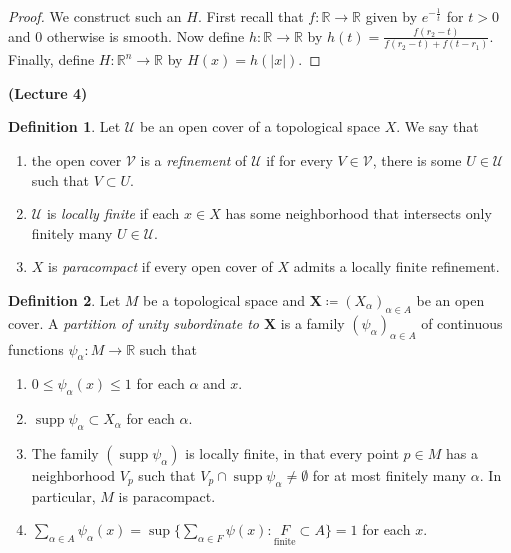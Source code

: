 \documentclass[10pt,letterpaper,cm]{nupset}
\theoremstyle{definition}
\newtheorem*{definition}{Definition}
\newcommand{\R}{\mathbb R}
\newcommand{\X}{\mathbf X}
\newcommand{\1}{\mathbf{1}}
\newcommand{\0}{\vec 0}
\DeclareMathOperator{\supp}{supp}
\begin{document}
\begin{proof}
We construct such an $H$. First recall that $f: \R \to \R$ given by $e^{-\frac{1}{t}}$ for $t>0$ and $0$ otherwise is smooth. Now define $h: \R \to \R$ by $h(t) = \frac{f(r_2-t)}{f(r_2-t)+ f(t-r_1)}$. Finally, define $H: \R^n \to \R$ by $H(x) = h(|x|)$.
\end{proof}

\begin{center}
{\textbf{(Lecture 4)}} 
\end{center}

\begin{definition}
Let $\mathcal{U}$ be an open cover of a topological space $X$. We say that 
\begin{enumerate}
\item the open cover $\mathcal{V}$ is a \textit{refinement} of $\mathcal{U}$ if for every $V\in \mathcal{V}$, there is some $U \in \mathcal{U}$ such that $V \subset U$.
\item $\mathcal{U}$ is \textit{locally finite} if each $x\in X$ has some neighborhood that intersects only finitely many $U \in \mathcal{U}$. 
\item $X$ is \textit{paracompact} if every open cover of $X$ admits a locally finite refinement.
\end{enumerate}
\end{definition}

\begin{definition} Let $M$ be a topological space and $\X\coloneqq (X_\alpha)_{\alpha \in A}$ be an open cover. A \textit{partition of unity subordinate to $\X$} is a family $(\psi_\alpha)_{\alpha \in A}$ of continuous functions $\psi_\alpha : M \to \R$ such that
\begin{enumerate}
\item $0\leq \psi_\alpha(x) \leq 1$ for each $\alpha$ and $x$.
\item $\supp \psi_\alpha \subset X_\alpha$ for each $\alpha$.
\item The family $(\supp \psi_\alpha)$ is locally finite, in that every point $p\in M$ has a neighborhood $V_p$ such that $V_p \cap \supp \psi_\alpha \ne \emptyset$ for at most finitely many $\alpha$. In particular, $M$ is paracompact.
\item $\sum_{\alpha \in A} \psi_\alpha(x) = \sup\{\sum_{\alpha \in F}\psi(x) : \underset{\text{finite}} F \subset A\} = 1$ for each $x$.
\end{enumerate}
\end{definition}
\end{document}
